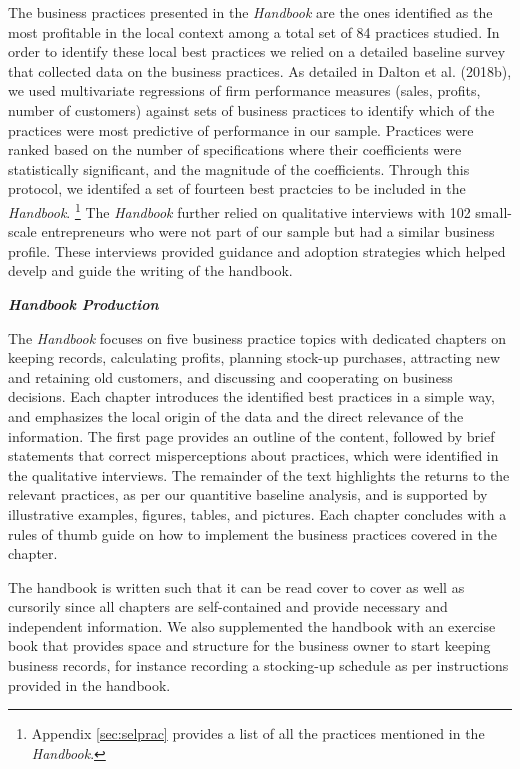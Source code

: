 \documentclass[11.5pt]{article}
\begin{document}
The business practices presented in the \emph{Handbook} are the ones identified as the most profitable in the local context among a total set of 84 practices studied. In order to identify these local best practices we relied on a detailed baseline survey that collected data on the business practices. As detailed in Dalton et al. (2018b), we used multivariate regressions of firm performance measures (sales, profits, number of customers) against sets of business practices to identify which of the practices were most predictive of performance in our sample. Practices were ranked based on the number of specifications where their coefficients were statistically significant, and the magnitude of the coefficients. Through this protocol, we identifed a set of fourteen best practcies to be included in the \emph{Handbook}. \footnote{Appendix \ref{sec:selprac} provides a list of all the practices mentioned in the \emph{Handbook}.} The \emph{Handbook} further relied on qualitative interviews with 102 small-scale entrepreneurs who were not part of our sample but had a similar business profile. These interviews provided guidance and adoption strategies which helped develp and guide the writing of the handbook.

\noindent \emph{\textbf{Handbook Production}}\

The \emph{Handbook} focuses on five business practice topics with dedicated chapters on keeping records, calculating profits, planning stock-up purchases, attracting new and retaining old customers, and discussing and cooperating on business decisions. Each chapter introduces the identified best practices in a simple way, and emphasizes the local origin of the data and the direct relevance of the information. The first page provides an outline of the content, followed by brief statements that correct misperceptions about practices, which were identified in the qualitative interviews. The remainder of the text highlights the returns to the relevant practices, as per our quantitive baseline analysis, and is supported by illustrative examples, figures, tables, and pictures. Each chapter concludes with a rules of thumb guide on how to implement the business practices covered in the chapter.

The handbook is written such that it can be read cover to cover as well as cursorily since all chapters are self-contained and provide necessary and independent information. We also supplemented the handbook with an exercise book that provides space and structure for the business owner to start keeping business records, for instance recording a stocking-up schedule as per instructions provided in the handbook.
\end{document}
